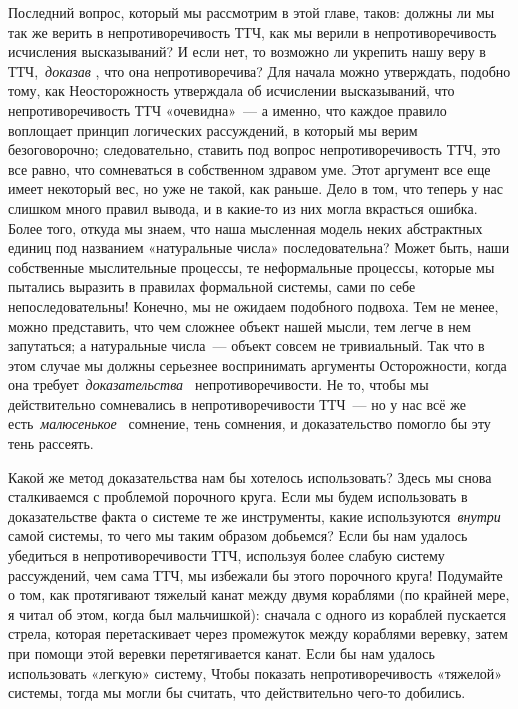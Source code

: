 \documentclass[../main.tex]{subfiles}
\begin{document}
Последний вопрос, который мы рассмотрим в этой главе, таков: должны ли мы так же верить в непротиворечивость ТТЧ, как мы верили в непротиворечивость исчисления высказываний? И если нет, то возможно ли укрепить нашу веру в ТТЧ,~\emph{доказав} , что она непротиворечива? Для начала можно утверждать, подобно тому, как Неосторожность утверждала об исчислении высказываний, что непротиворечивость ТТЧ «очевидна»~--- а именно, что каждое правило воплощает принцип логических рассуждений, в который мы верим безоговорочно; следовательно, ставить под вопрос непротиворечивость ТТЧ, это все равно, что сомневаться в собственном здравом уме. Этот аргумент все еще имеет некоторый вес, но уже не такой, как раньше. Дело в том, что теперь у нас слишком много правил вывода, и в какие-то из них могла вкрасться ошибка. Более того, откуда мы знаем, что наша мысленная модель неких абстрактных единиц под названием «натуральные числа» последовательна? Может быть, наши собственные мыслительные процессы, те неформальные процессы, которые мы пытались выразить в правилах формальной системы, сами по себе непоследовательны! Конечно, мы не ожидаем подобного подвоха. Тем не менее, можно представить, что чем сложнее объект нашей мысли, тем легче в нем запутаться; а натуральные числа~--- объект совсем не тривиальный. Так что в этом случае мы должны серьезнее воспринимать аргументы Осторожности, когда она требует~\emph{доказательства~} непротиворечивости. Не то, чтобы мы действительно сомневались в непротиворечивости ТТЧ~--- но у нас всё же есть~\emph{малюсенькое~} сомнение, тень сомнения, и доказательство помогло бы эту тень рассеять.

Какой же метод доказательства нам бы хотелось использовать? Здесь мы снова сталкиваемся с проблемой порочного круга. Если мы будем использовать в доказательстве факта о системе те же инструменты, какие используются~\emph{внутри~} самой системы, то чего мы таким образом добьемся? Если бы нам удалось убедиться в непротиворечивости ТТЧ, используя более слабую систему рассуждений, чем сама ТТЧ, мы избежали бы этого порочного круга! Подумайте о том, как протягивают тяжелый канат между двумя кораблями (по крайней мере, я читал об этом, когда был мальчишкой): сначала с одного из кораблей пускается стрела, которая перетаскивает через промежуток между кораблями веревку, затем при помощи этой веревки перетягивается канат. Если бы нам удалось использовать «легкую» систему, Чтобы показать непротиворечивость «тяжелой» системы, тогда мы могли бы считать, что действительно чего-то добились.
\end{document}

